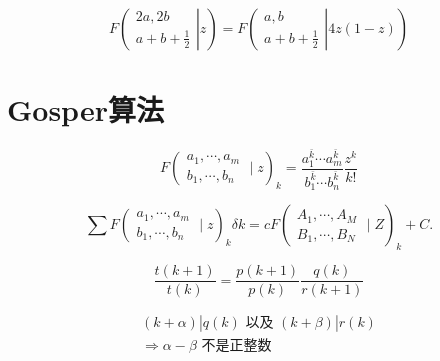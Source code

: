 \setcounter{equation}{109}
\begin{equation}
    \left.\left.F\left(\begin{array}{c}
    2 a, 2 b \\
    a+b+\frac{1}{2}
    \end{array}\right| z\right)=F\left(\begin{array}{c}
    a, b \\
    a+b+\frac{1}{2}
    \end{array}\right| 4 z(1-z)\right)
\end{equation}

\section{Gosper算法}

\setcounter{equation}{114}
\begin{equation}
    F\left(\begin{array}{c}
        a_{1}, \cdots, a_{m} \\
        b_{1}, \cdots, b_{n}
    \end{array} \mid z\right)_{k}=\frac{a_{1}^{\bar{k}} \cdots a_{m}^{\bar{k}}}{b_{1}^{\bar{k}} \cdots b_{n}^{\bar{k}}} \frac{z^{k}}{k !}
\end{equation}

\begin{equation}
    \sum F\left(\begin{array}{l}
        a_{1}, \cdots, a_{m} \\
        b_{1}, \cdots, b_{n}
        \end{array} \mid z\right)_{k} \delta k=c F\left(\begin{array}{l}
        A_{1}, \cdots, A_{M} \\
        B_{1}, \cdots, B_{N}
        \end{array} \mid Z\right)_{k}+C .
\end{equation}

\begin{equation}
    \frac{t(k+1)}{t(k)}=\frac{p(k+1)}{p(k)} \frac{q(k)}{r(k+1)}
\end{equation}

\begin{equation}
    \begin{gathered}
    (k+\alpha) | q(k) \text { 以及 }(k+\beta) | r(k) \\
    \Rightarrow \alpha-\beta \text { 不是正整数 }
    \end{gathered}
\end{equation}

